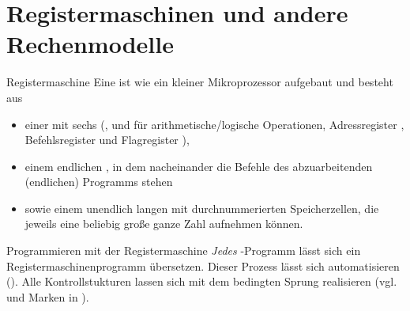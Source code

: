 \section{%
    Registermaschinen und andere Rechenmodelle%
}

\begin{Def}{Registermaschine}
    Eine  ist wie ein kleiner Mikroprozessor
    aufgebaut und besteht aus
    \begin{itemize}
        \item einer  mit sechs 
        (,  und  für
        arithmetische/logische Operationen,
        Adressregister , Befehlsregister 
        und Flagregister ),

        \item einem endlichen , in dem nacheinander
        die Befehle
        des abzuarbeitenden (endlichen) Programms stehen

        \item sowie einem unendlich langen  mit
        durchnummerierten Speicherzellen, die jeweils eine beliebig große ganze
        Zahl aufnehmen können.
    \end{itemize}
\end{Def}

\begin{Def}{Programmieren mit der Registermaschine}
    \emph{Jedes} \Ada{}-Programm lässt sich ein Registermaschinenprogramm
    übersetzen.
    Dieser Prozess lässt sich automatisieren ().
    Alle Kontrollstukturen lassen sich mit dem bedingten Sprung
     realisieren (vgl.  und Marken in \Ada{}).
\end{Def}

\pagebreak

